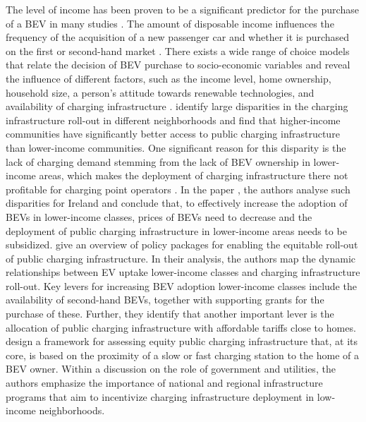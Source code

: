 \documentclass[preprint,review,11pt, authoryear]{elsarticle}
\begin{document}
    The level of income has been proven to be a significant predictor for the purchase of a BEV in many studies \citep{AUSTMANN2021101846}. The amount of disposable income influences the frequency of the acquisition of a new passenger car and whether it is purchased on the first or second-hand market \citep{STAJIC2023100658, VALENZUELALEVI2021161}. There exists a wide range of choice models that relate the decision of BEV purchase to socio-economic variables and reveal the influence of different factors, such as the income level, home ownership, household size, a person's attitude towards renewable technologies, and availability of charging infrastructure \citep{AUSTMANN2021101846, Liu2020}. \citet{GAZMEH2024104222} identify large disparities in the charging infrastructure roll-out in different neighborhoods and find that higher-income communities have significantly better access to public charging infrastructure than lower-income communities. One significant reason for this disparity is the lack of charging demand stemming from the lack of BEV ownership in lower-income areas, which makes the deployment of charging infrastructure there not profitable for charging point operators \citep{HOPKINS2023113398}. In the paper \citep{STEFANIEC2025101495}, the authors analyse such disparities for Ireland and conclude that, to effectively increase the adoption of BEVs in lower-income classes, prices of BEVs need to decrease and the deployment of public charging infrastructure in lower-income areas needs to be subsidized. 
    \citet{HOPKINS2023113398} give an overview of policy packages for enabling the equitable roll-out of public charging infrastructure. In their analysis, the authors map the dynamic relationships between EV uptake  lower-income classes and charging infrastructure roll-out. Key levers for increasing BEV adoption  lower-income classes include the availability of second-hand BEVs, together with supporting grants for the purchase of these. Further, they identify that another important lever is the allocation of public charging infrastructure with affordable tariffs close to homes. 
    \citet{Bhatt_2024} design a framework for assessing equity  public charging infrastructure that, at its core, is based on the proximity of a slow or fast charging station to the home of a BEV owner. Within a discussion on the role of government and utilities, the authors emphasize the importance of national and regional infrastructure programs that aim to incentivize charging infrastructure deployment in low-income neighborhoods.
    
\end{document}
